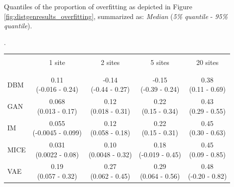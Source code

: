 \documentclass[12pt]{article}
\begin{document}
\begin{minipage}{\linewidth}
\captionsetup{type=table}
\caption{Quantiles of the proportion of overfitting as depicted in Figure \ref{fig:distgenresults_overfitting}, summarized as: {\em Median} ({\em 5\% quantile} - {\em 95\% quantile}).}\label{tab:distgenresults_overfitting}.
\begin{tabular}{l|cccc}
\\\\[-4\medskipamount]
& 1 site & 2 sites & 5 sites & 20 sites \\[0.5ex]
\hline
\\\\[-4\medskipamount]
DBM & \makecell{0.11 \\ (-0.016 - 0.24)} & \makecell{-0.14 \\ (-0.44 - 0.27)} & \makecell{-0.15 \\ (-0.39 - 0.24)} & \makecell{0.38 \\ (0.11 - 0.69)} \\[2ex]
GAN & \makecell{0.068 \\ (0.013 - 0.17)} & \makecell{0.12 \\ (0.018 - 0.31)} & \makecell{0.22 \\ (0.15 - 0.34)} & \makecell{0.43 \\ (0.29 - 0.55)} \\[2ex]
IM & \makecell{0.055 \\ (-0.0045 - 0.099)} & \makecell{0.12 \\ (0.058 - 0.18)} & \makecell{0.22 \\ (0.15 - 0.31)} & \makecell{0.45 \\ (0.30 - 0.63)} \\[2ex]
MICE & \makecell{0.031 \\ (0.0022 - 0.08)} & \makecell{0.10 \\ (0.0048 - 0.32)} & \makecell{0.18 \\ (-0.019 - 0.45)} & \makecell{0.45 \\ (0.09 - 0.85)} \\[2ex]
VAE & \makecell{0.19 \\ (0.057 - 0.32)} & \makecell{0.27 \\ (0.062 - 0.45)} & \makecell{0.29 \\ (0.064 - 0.56)} & \makecell{0.48 \\ (-0.20 - 0.82)} \\[2ex]
\end{tabular}
\end{minipage}
\end{document}
